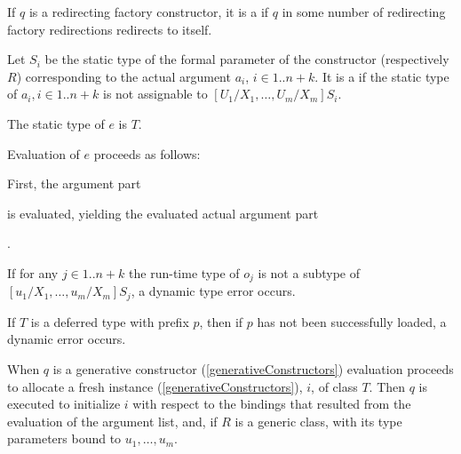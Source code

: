 \documentclass[makeidx]{article}
\begin{document}
{\LMHash{}%
If $q$ is a redirecting factory constructor,
it is a  if $q$ in some number of
redirecting factory redirections redirects to itself.

\LMHash{}%
Let $S_i$ be the static type of
the formal parameter of the constructor  (respectively $R$)
corresponding to the actual argument $a_i$, $i \in 1 .. n+k$.
It is a  if the static type of
$a_i, i \in 1 .. n + k$
is not assignable to $[U_1/X_1, \ldots, U_m/X_m]S_i$.

\LMHash{}%
The static type of $e$ is $T$.

\LMHash{}%
Evaluation of $e$ proceeds as follows:

\LMHash{}%
First, the argument part

\noindent
{}

\noindent
is evaluated, yielding the evaluated actual argument part

\noindent
{}.

\noindent
{}
If for any
$j \in 1 .. n + k$
the run-time type of $o_j$ is not a subtype of
$[u_1/X_1, \ldots, u_m/X_m]S_j$,
a dynamic type error occurs.

\LMHash{}%
If $T$ is a deferred type with prefix $p$,
then if $p$ has not been successfully loaded,
a dynamic error occurs.
\EndCase

\LMHash{}%
When $q$ is a generative constructor
(\ref{generativeConstructors})
evaluation proceeds to allocate a fresh instance
(\ref{generativeConstructors}), $i$, of class $T$.
Then $q$ is executed to initialize $i$ with respect to
the bindings that resulted from the evaluation of the argument list, and,
if $R$ is a generic class,
with its type parameters bound to $u_1, \ldots, u_m$.

}
\end{document}
